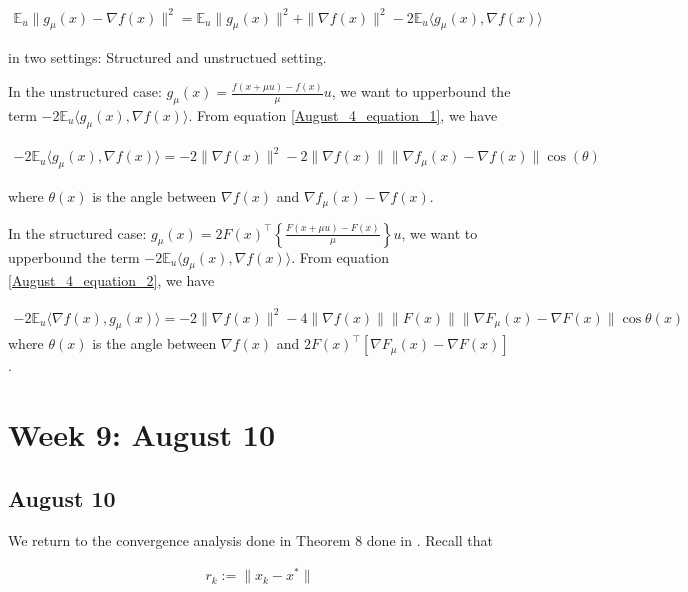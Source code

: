 \documentclass{article}
\begin{document}
\begin{align*}
\mathbb{E}_u\|g_{\mu}(x)-\nabla f(x)\|^2 = \mathbb{E}_u\|g_{\mu}(x)\|^2 + \|\nabla f(x)\|^2 - 2\mathbb{E}_u\langle g_{\mu}(x),\nabla f(x)\rangle
\end{align*}

in two settings: Structured and unstructued setting. \newline 

In the unstructured case: $g_{\mu}(x) = \frac{f(x+\mu u)-f(x)}{\mu}u$, we want to upperbound the term $-2\mathbb{E}_u\langle g_{\mu}(x),\nabla f(x)\rangle$. From equation \eqref{August_4_equation_1}, we have 

\begin{align}
-2\mathbb{E}_u\langle g_{\mu}(x),\nabla f(x)\rangle = -2\|\nabla f(x)\|^2 - 2\|\nabla f(x)\|\|\nabla f_{\mu}(x) - \nabla f(x)\|\cos(\theta)
\end{align}

where $\theta(x)$ is the angle between $\nabla f(x)$ and $\nabla f_{\mu}(x) - \nabla f(x)$. \newline 

In the structured case: $g_{\mu}(x) = 2F(x)^\top\left\{\frac{F(x+\mu u)-F(x)}{\mu}\right\}u$, we want to upperbound the term $-2\mathbb{E}_u\langle g_{\mu}(x),\nabla f(x)\rangle$. From equation \eqref{August_4_equation_2}, we have 

\begin{align}
-2\mathbb{E}_u\langle \nabla f(x),g_{\mu}(x)\rangle = -2\|\nabla f(x)\|^2 -4\| \nabla f(x)\|\|F(x)\| \|\nabla F_{\mu}(x) - \nabla F(x)\| \cos \theta(x) \label{August10_inner_product_expectation}
\end{align}
where $\theta(x)$ is the angle between $\nabla f(x)$ and $2F(x)^\top[\nabla F_{\mu}(x)-\nabla F(x)]$. 




\section{Week 9: August 10}

\subsection{August 10}

We return to the convergence analysis done in Theorem $8$ done in \cite{Nesterov2015}. Recall that 

\begin{align*}
r_k := \|x_k - x^*\|
\end{align*} 
\end{document}
